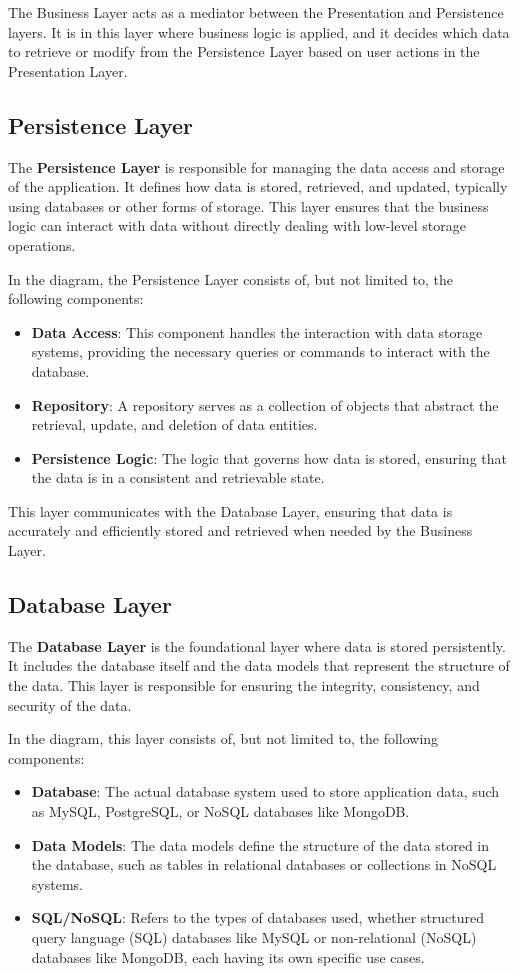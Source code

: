 The Business Layer acts as a mediator between the Presentation and Persistence layers. It is in this layer where business logic is applied, and it decides which data to retrieve or modify from the Persistence Layer based on user actions in the Presentation Layer.

\subsection{Persistence Layer}

The \textbf{Persistence Layer} is responsible for managing the data access and storage of the application. It defines how data is stored, retrieved, and updated, typically using databases or other forms of storage. This layer ensures that the business logic can interact with data without directly dealing with low-level storage operations.

In the diagram, the Persistence Layer consists of, but not limited to, the following components:
\begin{itemize}
	\item \textbf{Data Access}: This component handles the interaction with data storage systems, providing the necessary queries or commands to interact with the database.
	\item \textbf{Repository}: A repository serves as a collection of objects that abstract the retrieval, update, and deletion of data entities.
	\item \textbf{Persistence Logic}: The logic that governs how data is stored, ensuring that the data is in a consistent and retrievable state.
\end{itemize}

This layer communicates with the Database Layer, ensuring that data is accurately and efficiently stored and retrieved when needed by the Business Layer.

\subsection{Database Layer}

The \textbf{Database Layer} is the foundational layer where data is stored persistently. It includes the database itself and the data models that represent the structure of the data. This layer is responsible for ensuring the integrity, consistency, and security of the data.

In the diagram, this layer consists of, but not limited to, the following components:
\begin{itemize}
	\item \textbf{Database}: The actual database system used to store application data, such as MySQL, PostgreSQL, or NoSQL databases like MongoDB.
	\item \textbf{Data Models}: The data models define the structure of the data stored in the database, such as tables in relational databases or collections in NoSQL systems.
	\item \textbf{SQL/NoSQL}: Refers to the types of databases used, whether structured query language (SQL) databases like MySQL or non-relational (NoSQL) databases like MongoDB, each having its own specific use cases.
\end{itemize}


